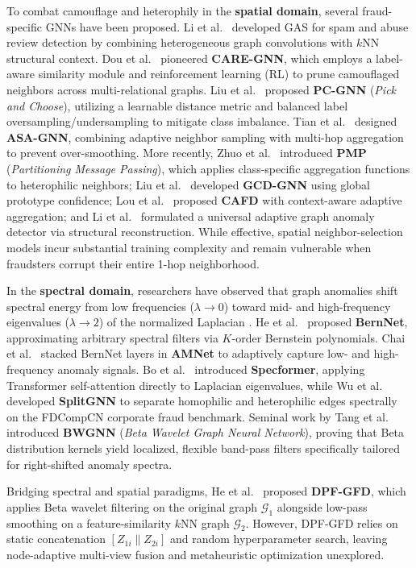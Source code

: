 \documentclass[10pt,a4paper,twocolumn]{article}
\begin{document}
To combat camouflage and heterophily in the \textbf{spatial domain}, several fraud-specific GNNs have been proposed. Li et al.\ \cite{ref35} developed GAS for spam and abuse review detection by combining heterogeneous graph convolutions with $k$NN structural context. Dou et al.\ \cite{ref8} pioneered \textbf{CARE-GNN}, which employs a label-aware similarity module and reinforcement learning (RL) to prune camouflaged neighbors across multi-relational graphs. Liu et al.\ \cite{ref48} proposed \textbf{PC-GNN} (\textit{Pick and Choose}), utilizing a learnable distance metric and balanced label oversampling/undersampling to mitigate class imbalance. Tian et al.\ \cite{ref10} designed \textbf{ASA-GNN}, combining adaptive neighbor sampling with multi-hop aggregation to prevent over-smoothing. More recently, Zhuo et al.\ \cite{ref49} introduced \textbf{PMP} (\textit{Partitioning Message Passing}), which applies class-specific aggregation functions to heterophilic neighbors; Liu et al.\ \cite{ref11} developed \textbf{GCD-GNN} using global prototype confidence; Lou et al.\ \cite{ref12} proposed \textbf{CAFD} with context-aware adaptive aggregation; and Li et al.\ \cite{ref36} formulated a universal adaptive graph anomaly detector via structural reconstruction. While effective, spatial neighbor-selection models incur substantial training complexity and remain vulnerable when fraudsters corrupt their entire 1-hop neighborhood.

In the \textbf{spectral domain}, researchers have observed that graph anomalies shift spectral energy from low frequencies ($\lambda \to 0$) toward mid- and high-frequency eigenvalues ($\lambda \to 2$) of the normalized Laplacian \cite{ref32,ref50}. He et al.\ \cite{ref30} proposed \textbf{BernNet}, approximating arbitrary spectral filters via $K$-order Bernstein polynomials. Chai et al.\ \cite{ref50} stacked BernNet layers in \textbf{AMNet} to adaptively capture low- and high-frequency anomaly signals. Bo et al.\ \cite{ref31} introduced \textbf{Specformer}, applying Transformer self-attention directly to Laplacian eigenvalues, while Wu et al.\ \cite{ref41} developed \textbf{SplitGNN} to separate homophilic and heterophilic edges spectrally on the FDCompCN corporate fraud benchmark. Seminal work by Tang et al.\ \cite{ref32} introduced \textbf{BWGNN} (\textit{Beta Wavelet Graph Neural Network}), proving that Beta distribution kernels \cite{ref34} yield localized, flexible band-pass filters specifically tailored for right-shifted anomaly spectra.

Bridging spectral and spatial paradigms, He et al.\ \cite{ref9} proposed \textbf{DPF-GFD}, which applies Beta wavelet filtering on the original graph $\mathscr{G}_1$ alongside low-pass smoothing on a feature-similarity $k$NN graph $\mathscr{G}_2$. However, DPF-GFD relies on static concatenation $[Z_{1i} \parallel Z_{2i}]$ and random hyperparameter search, leaving node-adaptive multi-view fusion and metaheuristic optimization unexplored.
\end{document}
